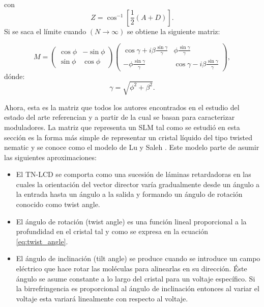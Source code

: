 con \[Z = \cos^{-1}{\left[\frac{1}{2}(A+D)\right]}.\]
Si se saca el límite cuando $(N\rightarrow \infty)$ se obtiene la
siguiente matriz:


\begin{equation}
  \label{eq:TN-LCD_Jones_Matrix}
  M=
  \begin{pmatrix}
    \cos{\phi} & -\sin{\phi}\\\sin{\phi}&\cos{\phi}
  \end{pmatrix}
  \begin{pmatrix}
    \cos{\gamma}+i\beta\frac{\sin{\gamma}}{\gamma} & \phi\frac{\sin{\gamma}}{\gamma}\\
-\phi\frac{\sin{\gamma}}{\gamma}   & \cos{\gamma}-i\beta\frac{\sin{\gamma}}{\gamma}
  \end{pmatrix},
\end{equation} 
dónde:
\[\gamma=\sqrt{\phi^2+\beta^2}.\]

Ahora, esta es la matriz que todos los autores encontrados en el
estudio del estado del arte referencian y a partir de la cual se basan
para caracterizar moduladores. La matriz que representa un
SLM  tal como se estudió en esta sección es la forma más
simple de representar un cristal líquido del tipo twisted nematic y se
conoce como el modelo de Lu y Saleh . Este modelo
parte de asumir las siguientes aproximaciones:

\begin{itemize}
\item El TN-LCD se comporta como una sucesión de  láminas
  retardadoras en las cuales la orientación del vector director varía
  gradualmente desde un ángulo a la entrada hasta un ángulo a la
  salida y formando un ángulo de rotación conocido como twist angle. 
\item El ángulo de rotación (twist angle) es una función lineal
  proporcional a la profundidad en el cristal tal y como se expresa en
  la ecuación \ref{eq:twist_angle}.
\item El ángulo de inclinación (tilt angle) se produce cuando se
  introduce un campo eléctrico que hace rotar las moléculas para
  alinearlas en su dirección. Éste ángulo se asume constante a lo
  largo del cristal para un voltaje específico. Si la birrefringencia
  es proporcional al ángulo de inclinación entonces al variar el
  voltaje esta variará linealmente con respecto al voltaje.
\end{itemize}

